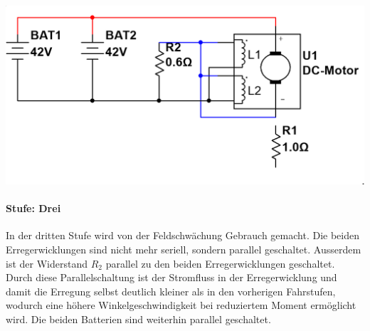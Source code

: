 \begin{minipage}{0.49\textwidth}
	\includegraphics[width=\columnwidth]{images/Stufenschalter/Stufe_3.png}%
\end{minipage}
\begin{minipage}{0.5\textwidth}
	\paragraph{Stufe: Drei}
	In der dritten Stufe wird von der Feldschwächung Gebrauch gemacht. Die beiden Erregerwicklungen sind nicht mehr seriell, sondern parallel geschaltet. Ausserdem ist der Widerstand $R_2$ parallel zu den beiden Erregerwicklungen geschaltet. Durch diese Parallelschaltung ist der Stromfluss in der Erregerwicklung und damit die Erregung selbst deutlich kleiner als in den vorherigen Fahrstufen, wodurch eine höhere Winkelgeschwindigkeit bei reduziertem Moment ermöglicht wird. Die beiden Batterien sind weiterhin parallel geschaltet.
\end{minipage}

